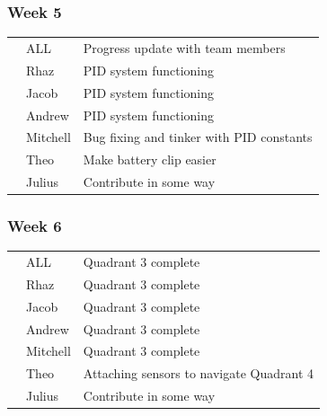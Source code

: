 \documentclass[paper=a4, fontsize=11pt]{scrartcl} %
\def\checkmark{\tikz\fill[scale=0.4] (0,.35) -- (.25,0) -- (1,.7) -- (.25,.15) -- cycle;}
\def\scalecheck{\resizebox{\widthof{\checkmark}*\ratio{\widthof{x}}{\widthof{\normalsize x}}}{!}{\checkmark}}
\numberwithin{equation}{section} %
\numberwithin{figure}{section} %
\begin{document}
\subsubsection*{Week 5}
\begin{tabularx}{\textwidth}{clX}
  \scalecheck & ALL      & Progress update with team members\\
  \scalecheck & Rhaz     & PID system functioning\\
  \scalecheck & Jacob    & PID system functioning\\
  \scalecheck & Andrew   & PID system functioning\\
  \scalecheck & Mitchell & Bug fixing and tinker with PID constants\\
  \scalecheck & Theo     & Make battery clip easier\\
              & Julius   & Contribute in some way\\
\end{tabularx}
\subsubsection*{Week 6}
\begin{tabularx}{\textwidth}{clX}
              & ALL      & Quadrant 3 complete\\
              & Rhaz     & Quadrant 3 complete\\
              & Jacob    & Quadrant 3 complete\\ 
              & Andrew   & Quadrant 3 complete\\ 
              & Mitchell & Quadrant 3 complete\\ 
  \scalecheck & Theo     & Attaching sensors to navigate Quadrant 4\\
              & Julius   & Contribute in some way\\
\end{tabularx}
\end{document}
